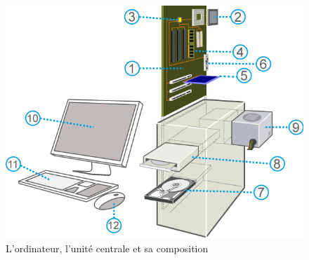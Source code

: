 \documentclass[11pt, a4paper]{book}
\begin{document}
\begin{center}
\begin{figure}[h]
	\includegraphics[scale=.6]{images/composants}
	\caption{L'ordinateur, l'unité centrale et sa composition}
	\label{composants}
\end{figure}
\end{center}
\end{document}
